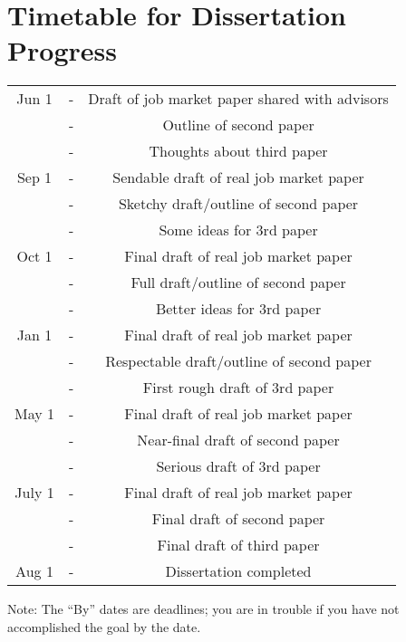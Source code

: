 \documentclass{\econtex}
\begin{document}
\vfill\eject\pagebreak
\section*{\LARGE Timetable for Dissertation Progress}

\begin{center}
\begin{tabular}{|ccc|}\hline
     Jun 1 & - & Draft of job market paper shared with advisors
\\       & - & Outline of second paper
\\       & - & Thoughts about third paper
\\   Sep 1 & - & Sendable draft of real job market paper
\\     & - & Sketchy draft/outline of second paper
\\     & - & Some ideas for 3rd paper
\\ Oct 1 & - & Final draft of real job market paper
\\     & - & Full draft/outline of second paper
\\     & - & Better ideas for 3rd paper
\\ Jan 1 & - & Final draft of real job market paper
\\     & - & Respectable draft/outline of second paper
\\     & - & First rough draft of 3rd paper
\\ May 1 & - & Final draft of real job market paper
\\     & - & Near-final draft of second paper
\\     & - & Serious draft of 3rd paper
\\ July 1 & - & Final draft of real job market paper
\\     & - & Final draft of second paper
\\     & - & Final draft of third paper
\\ Aug 1 & - & Dissertation completed
\\ \hline 
\end{tabular}
\end{center}
Note: The ``By'' dates are deadlines; you are in trouble if you have not
accomplished the goal by the date.
\end{document}
